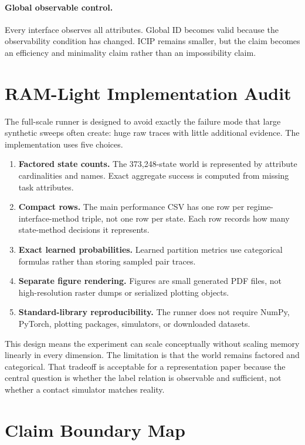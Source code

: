 \documentclass{article}
\newcommand{\icip}{\textsc{ICIP}}
\begin{document}
\paragraph{Global observable control.}
Every interface observes all attributes.
Global ID becomes valid because the observability condition has changed.
\icip{} remains smaller, but the claim becomes an efficiency and minimality claim rather than an impossibility claim.

\section{RAM-Light Implementation Audit}

The full-scale runner is designed to avoid exactly the failure mode that large synthetic sweeps often create: huge raw traces with little additional evidence.
The implementation uses five choices.

\begin{enumerate}
    \item \textbf{Factored state counts.} The 373,248-state world is represented by attribute cardinalities and names. Exact aggregate success is computed from missing task attributes.
    \item \textbf{Compact rows.} The main performance CSV has one row per regime-interface-method triple, not one row per state. Each row records how many state-method decisions it represents.
    \item \textbf{Exact learned probabilities.} Learned partition metrics use categorical formulas rather than storing sampled pair traces.
    \item \textbf{Separate figure rendering.} Figures are small generated PDF files, not high-resolution raster dumps or serialized plotting objects.
    \item \textbf{Standard-library reproducibility.} The runner does not require NumPy, PyTorch, plotting packages, simulators, or downloaded datasets.
\end{enumerate}

This design means the experiment can scale conceptually without scaling memory linearly in every dimension.
The limitation is that the world remains factored and categorical.
That tradeoff is acceptable for a representation paper because the central question is whether the label relation is observable and sufficient, not whether a contact simulator matches reality.

\section{Claim Boundary Map}
\end{document}
